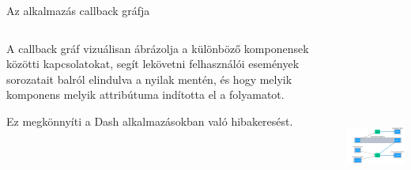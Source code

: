 \documentclass[english, aspectratio=169]{beamer}
\begin{document}
\begin{frame}{Az alkalmazás callback gráfja}
	\begin{columns}
		\begin{column}{.5\textwidth}
			A callback gráf vizuálisan ábrázolja a különböző komponensek közötti kapcsolatokat, segít lekövetni felhasználói események sorozatait balról elindulva a nyilak mentén, és hogy melyik komponens melyik attribútuma indította el a folyamatot.\par\medskip 
			Ez megkönnyíti a Dash alkalmazásokban való hibakeresést. 
		\end{column}
		\begin{column}{.5\textwidth}
			\begin{center}
				\includegraphics[width=7cm, height=7cm, keepaspectratio]{images/freq_24.png}
			\end{center}
		\end{column}
	\end{columns}
\end{frame}
\end{document}
